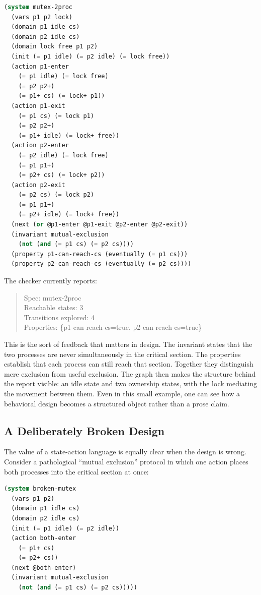 \documentclass[11pt]{article}
\begin{document}
\begin{lstlisting}[language=Lisp]
(system mutex-2proc
  (vars p1 p2 lock)
  (domain p1 idle cs)
  (domain p2 idle cs)
  (domain lock free p1 p2)
  (init (= p1 idle) (= p2 idle) (= lock free))
  (action p1-enter
    (= p1 idle) (= lock free)
    (= p2 p2+)
    (= p1+ cs) (= lock+ p1))
  (action p1-exit
    (= p1 cs) (= lock p1)
    (= p2 p2+)
    (= p1+ idle) (= lock+ free))
  (action p2-enter
    (= p2 idle) (= lock free)
    (= p1 p1+)
    (= p2+ cs) (= lock+ p2))
  (action p2-exit
    (= p2 cs) (= lock p2)
    (= p1 p1+)
    (= p2+ idle) (= lock+ free))
  (next (or @p1-enter @p1-exit @p2-enter @p2-exit))
  (invariant mutual-exclusion
    (not (and (= p1 cs) (= p2 cs))))
  (property p1-can-reach-cs (eventually (= p1 cs)))
  (property p2-can-reach-cs (eventually (= p2 cs))))
\end{lstlisting}

The checker currently reports:

\begin{quote}
Spec: mutex-2proc\\
Reachable states: 3\\
Transitions explored: 4\\
Properties: \{p1-can-reach-cs=true, p2-can-reach-cs=true\}
\end{quote}

This is the sort of feedback that matters in design. The invariant states that
the two processes are never simultaneously in the critical section. The
properties establish that each process can still reach that section. Together
they distinguish mere exclusion from useful exclusion. The graph then makes the
structure behind the report visible: an idle state and two ownership states,
with the lock mediating the movement between them. Even in this small example,
one can see how a behavioral design becomes a structured object rather than a
prose claim.

\subsection{A Deliberately Broken Design}

The value of a state-action language is equally clear when the design is wrong.
Consider a pathological ``mutual exclusion'' protocol in which one action
places both processes into the critical section at once:

\begin{lstlisting}[language=Lisp]
(system broken-mutex
  (vars p1 p2)
  (domain p1 idle cs)
  (domain p2 idle cs)
  (init (= p1 idle) (= p2 idle))
  (action both-enter
    (= p1+ cs)
    (= p2+ cs))
  (next @both-enter)
  (invariant mutual-exclusion
    (not (and (= p1 cs) (= p2 cs)))))
\end{lstlisting}
\end{document}

